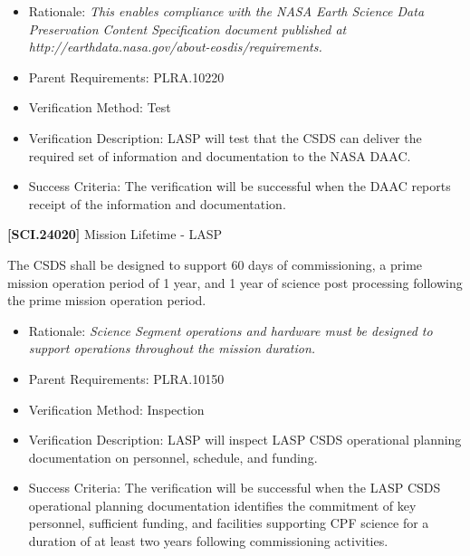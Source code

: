\begin{itemize}
\item{} Rationale: \emph{This enables compliance with the NASA Earth Science Data Preservation Content Specification document published at http:\slash \slash earthdata.nasa.gov\slash about-eosdis\slash requirements.}

\item{} Parent Requirements: PLRA.10220

\item{} Verification Method: Test

\item{} Verification Description: \gls{LASP} will \gls{test} that the \gls{CSDS} can deliver the required set of information and documentation to the NASA \gls{DAAC}.

\item{} Success Criteria: The verification will be successful when the \gls{DAAC} reports receipt of the information and documentation.

\end{itemize}

\textbf{[SCI.24020]} Mission Lifetime - \gls{LASP}

The \gls{CSDS} shall be designed to support 60 days of commissioning, a prime mission operation period of 1 year, and 1 year of science post processing following the prime mission operation period.

\begin{itemize}
\item{} Rationale: \emph{Science Segment operations and hardware must be designed to support operations throughout the mission duration.}

\item{} Parent Requirements: PLRA.10150

\item{} Verification Method: Inspection

\item{} Verification Description: \gls{LASP} will inspect \gls{LASP} \gls{CSDS} operational planning documentation on personnel, schedule, and funding.

\item{} Success Criteria: The verification will be successful when the \gls{LASP} \gls{CSDS} operational planning documentation identifies the commitment of key personnel, sufficient funding, and facilities supporting \gls{CPF} science for a duration of at least two years following commissioning activities.

\end{itemize}


